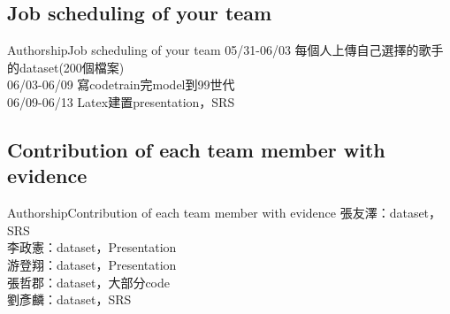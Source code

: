 \documentclass{beamer}
\begin{document}
\begin{CJK}{UTF8}{nkai}
\subsection*{Job scheduling of your team}
\begin{frame}{Authorship}{Job scheduling of your team}
05/31-06/03 每個人上傳自己選擇的歌手的dataset(200個檔案)\\
06/03-06/09 寫codetrain完model到99世代\\
06/09-06/13 Latex建置presentation，SRS
 \end{frame}

\subsection*{Contribution of each team member with evidence}
\begin{frame}{Authorship}{Contribution of each team member with evidence}
張友澤：dataset，SRS\\
李政憲：dataset，Presentation\\ 
游登翔：dataset，Presentation\\ 
張哲郡：dataset，大部分code\\ 
劉彥麟：dataset，SRS\\
 \end{frame}

\end{CJK}
\end{document}
